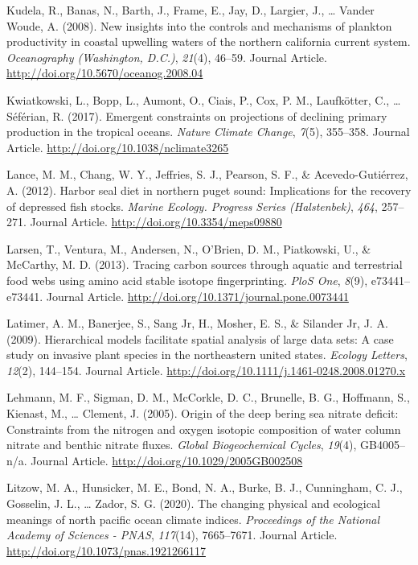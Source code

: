 \documentclass [11pt, proquest] {uwthesis}[2015/03/03]
\begin{document}
\hypertarget{ref-Kudela2008}{}
Kudela, R., Banas, N., Barth, J., Frame, E., Jay, D., Largier, J.,
\ldots{} Vander Woude, A. (2008). New insights into the controls and
mechanisms of plankton productivity in coastal upwelling waters of the
northern california current system. \emph{Oceanography (Washington,
D.C.)}, \emph{21}(4), 46--59. Journal Article.
\url{http://doi.org/10.5670/oceanog.2008.04}

\hypertarget{ref-Kwiatkowski2017}{}
Kwiatkowski, L., Bopp, L., Aumont, O., Ciais, P., Cox, P. M.,
Laufkötter, C., \ldots{} Séférian, R. (2017). Emergent constraints on
projections of declining primary production in the tropical oceans.
\emph{Nature Climate Change}, \emph{7}(5), 355--358. Journal Article.
\url{http://doi.org/10.1038/nclimate3265}

\hypertarget{ref-Lance2012}{}
Lance, M. M., Chang, W. Y., Jeffries, S. J., Pearson, S. F., \&
Acevedo-Gutiérrez, A. (2012). Harbor seal diet in northern puget sound:
Implications for the recovery of depressed fish stocks. \emph{Marine
Ecology. Progress Series (Halstenbek)}, \emph{464}, 257--271. Journal
Article. \url{http://doi.org/10.3354/meps09880}

\hypertarget{ref-Larsen2013}{}
Larsen, T., Ventura, M., Andersen, N., O'Brien, D. M., Piatkowski, U.,
\& McCarthy, M. D. (2013). Tracing carbon sources through aquatic and
terrestrial food webs using amino acid stable isotope fingerprinting.
\emph{PloS One}, \emph{8}(9), e73441--e73441. Journal Article.
\url{http://doi.org/10.1371/journal.pone.0073441}

\hypertarget{ref-Latimer2009}{}
Latimer, A. M., Banerjee, S., Sang Jr, H., Mosher, E. S., \& Silander
Jr, J. A. (2009). Hierarchical models facilitate spatial analysis of
large data sets: A case study on invasive plant species in the
northeastern united states. \emph{Ecology Letters}, \emph{12}(2),
144--154. Journal Article.
\url{http://doi.org/10.1111/j.1461-0248.2008.01270.x}

\hypertarget{ref-Lehmann2005}{}
Lehmann, M. F., Sigman, D. M., McCorkle, D. C., Brunelle, B. G.,
Hoffmann, S., Kienast, M., \ldots{} Clement, J. (2005). Origin of the
deep bering sea nitrate deficit: Constraints from the nitrogen and
oxygen isotopic composition of water column nitrate and benthic nitrate
fluxes. \emph{Global Biogeochemical Cycles}, \emph{19}(4), GB4005--n/a.
Journal Article. \url{http://doi.org/10.1029/2005GB002508}

\hypertarget{ref-Litzow2020}{}
Litzow, M. A., Hunsicker, M. E., Bond, N. A., Burke, B. J., Cunningham,
C. J., Gosselin, J. L., \ldots{} Zador, S. G. (2020). The changing
physical and ecological meanings of north pacific ocean climate indices.
\emph{Proceedings of the National Academy of Sciences - PNAS},
\emph{117}(14), 7665--7671. Journal Article.
\url{http://doi.org/10.1073/pnas.1921266117}
\end{document}
